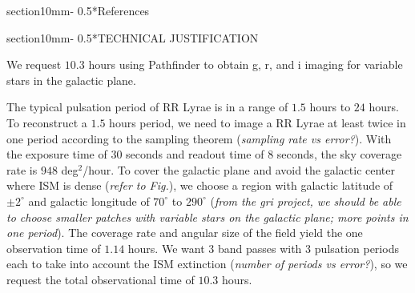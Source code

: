 \documentclass[letterpaper,11pt]{article}
\makeatletter
\renewcommand{\section}{\@startsection%
{section}{1}{0mm}{-\baselineskip}%
{0.5\baselineskip}{\normalfont\Large\bfseries}}%
\makeatother
\begin{document}
\section*{References}

\noindent{}

\noindent{}

\noindent{}

\noindent{}

\noindent{}

\section*{TECHNICAL JUSTIFICATION}


We request $10.3$ hours using Pathfinder to obtain g, r, and i imaging for variable stars in the galactic plane.

\vspace{3mm} %

\noindent The typical pulsation period of RR Lyrae is in a range of $1.5$ hours to $24$ hours. To reconstruct a $1.5$ hours period, we need to image a RR Lyrae at least twice in one period according to the sampling theorem (\textit{sampling rate vs error?}). With the exposure time of $30$ seconds and readout time of $8$ seconds, the sky coverage rate is $948$ deg$^2$/hour. To cover the galactic plane and avoid the galactic center where ISM is dense (\textit{refer to Fig.}), we choose a region with galactic latitude of $\pm 2 ^\circ$ and galactic longitude of $70 ^\circ$ to $290 ^\circ$ (\textit{from the gri project, we should be able to choose smaller patches with variable stars on the galactic plane; more points in one period}). The coverage rate and angular size of the field yield the one observation time of $1.14$ hours. We want $3$ band passes with $3$ pulsation periods each to take into account the ISM extinction (\textit{number of periods vs error?}), so we request the total observational time of $10.3$ hours.
\end{document}
